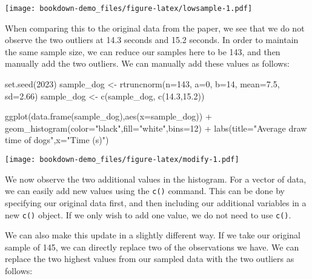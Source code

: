 \documentclass[
]{book}
\newenvironment{Shaded}{\begin{snugshade}}{\end{snugshade}}
\newcommand{\AttributeTok}[1]{\textcolor[rgb]{0.77,0.63,0.00}{#1}}
\newcommand{\DecValTok}[1]{\textcolor[rgb]{0.00,0.00,0.81}{#1}}
\newcommand{\FloatTok}[1]{\textcolor[rgb]{0.00,0.00,0.81}{#1}}
\newcommand{\FunctionTok}[1]{\textcolor[rgb]{0.00,0.00,0.00}{#1}}
\newcommand{\NormalTok}[1]{#1}
\newcommand{\OtherTok}[1]{\textcolor[rgb]{0.56,0.35,0.01}{#1}}
\newcommand{\SpecialCharTok}[1]{\textcolor[rgb]{0.00,0.00,0.00}{#1}}
\newcommand{\StringTok}[1]{\textcolor[rgb]{0.31,0.60,0.02}{#1}}
\begin{document}
\texttt{[image: bookdown-demo\_files/figure-latex/lowsample-1.pdf]}

When comparing this to the original data from the paper, we see that we do not observe the two outliers at 14.3 seconds and 15.2 seconds. In order to maintain the same sample size, we can reduce our samples here to be 143, and then manually add the two outliers. We can manually add these values as follows:

\begin{Shaded}
\begin{Highlighting}[]
\FunctionTok{set.seed}\NormalTok{(}\DecValTok{2023}\NormalTok{)}
\NormalTok{sample\_dog }\OtherTok{\textless{}{-}} \FunctionTok{rtruncnorm}\NormalTok{(}\AttributeTok{n=}\DecValTok{143}\NormalTok{, }\AttributeTok{a=}\DecValTok{0}\NormalTok{, }\AttributeTok{b=}\DecValTok{14}\NormalTok{, }\AttributeTok{mean=}\FloatTok{7.5}\NormalTok{, }\AttributeTok{sd=}\FloatTok{2.66}\NormalTok{)}
\NormalTok{sample\_dog }\OtherTok{\textless{}{-}} \FunctionTok{c}\NormalTok{(sample\_dog, }\FunctionTok{c}\NormalTok{(}\FloatTok{14.3}\NormalTok{,}\FloatTok{15.2}\NormalTok{))}

\FunctionTok{ggplot}\NormalTok{(}\FunctionTok{data.frame}\NormalTok{(sample\_dog),}\FunctionTok{aes}\NormalTok{(}\AttributeTok{x=}\NormalTok{sample\_dog)) }\SpecialCharTok{+}
  \FunctionTok{geom\_histogram}\NormalTok{(}\AttributeTok{color=}\StringTok{"black"}\NormalTok{,}\AttributeTok{fill=}\StringTok{"white"}\NormalTok{,}\AttributeTok{bins=}\DecValTok{12}\NormalTok{) }\SpecialCharTok{+} 
            \FunctionTok{labs}\NormalTok{(}\AttributeTok{title=}\StringTok{"Average draw time of dogs"}\NormalTok{,}\AttributeTok{x=}\StringTok{"Time (s)"}\NormalTok{)}
\end{Highlighting}
\end{Shaded}

\texttt{[image: bookdown-demo\_files/figure-latex/modify-1.pdf]}

We now observe the two additional values in the histogram. For a vector of data, we can easily add new values using the \texttt{c()} command. This can be done by specifying our original data first, and then including our additional variables in a new \texttt{c()} object. If we only wish to add one value, we do not need to use \texttt{c()}.

We can also make this update in a slightly different way. If we take our original sample of 145, we can directly replace two of the observations we have. We can replace the two highest values from our sampled data with the two outliers as follows:
\end{document}
